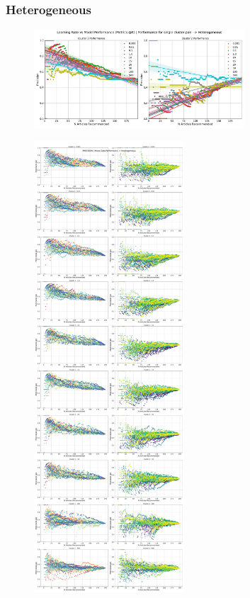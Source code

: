 \documentclass[a4paper,fontsize=8.0pt]{scrartcl}
\begin{document}
\subsubsection{Heterogeneous}
\begin{figure}[H]
    \includegraphics[width=0.7\textwidth]{Graphs/TFIDF/lr_vs_model_performance_single_mixed_Heterogeneous.pdf}
\end{figure}
\newpage
\begin{figure}[H]
    \includegraphics[width=0.5\textwidth]{Graphs/TFIDF/lr_vs_model_performance_precision_all_cps_mixed_data_sep_Heterogeneous.pdf}
\end{figure}
\end{document}
